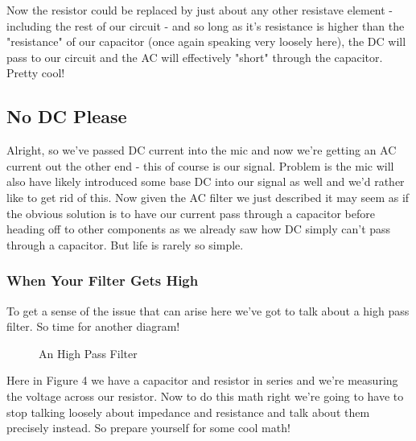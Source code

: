 \documentclass[12pt,a6paper]{book}
\begin{document}
Now the resistor could be replaced by just about any other resistave element - including the rest of our circuit - and so long as it's resistance is higher than the "resistance" of our capacitor (once again speaking very loosely here), the DC will pass to our circuit and the AC will effectively "short" through the capacitor. Pretty cool! 

\subsection{No DC Please}

Alright, so we've passed DC current into the mic and now we're getting an AC current out the other end - this of course is our signal. Problem is the mic will also have likely introduced some base DC into our signal as well and we'd rather like to get rid of this. Now given the AC filter we just described it may seem as if the obvious solution is to have our current pass through a capacitor before heading off to other components as we already saw how DC simply can't pass through a capacitor. But life is rarely so simple. 

\subsubsection{When Your Filter Gets High}

To get a sense of the issue that can arise here we've got to talk about a high pass filter. So time for another diagram!

\begin{figure}[!htb]
\caption{\label{fig:my-label} An High Pass Filter}
\end{figure}

Here in Figure 4 we have a capacitor and resistor in series and we're measuring the voltage across our resistor. Now to do this math right we're going to have to stop talking loosely about impedance and resistance and talk about them precisely instead. So prepare yourself for some cool math! 
\end{document}
